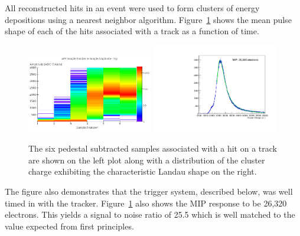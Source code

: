 All reconstructed hits in an event were used to form clusters of energy 
depositions using a nearest neighbor algorithm. Figure~\ref{fig:cluster_pulse}
shows the mean pulse shape of each of the hits associated with a track as a 
function of time.  
\begin{figure}[h]
	\includegraphics[width=0.49\textwidth]{test2012/svtperformance/svt_calib/08062012_run1351_samples_vs_amplitude.png}
	\includegraphics[width=0.49\textwidth]{test2012/svtperformance/svt_calib/run1351_mip_small.pdf}
    \caption{The six pedestal subtracted samples associated with a hit on a track 
             are shown on the left plot along with a distribution of the cluster
             charge exhibiting the characteristic Landau shape on the right. 
            }
	\label{fig:cluster_pulse}
\end{figure}
The figure also demonstrates that  the trigger system, described below, was well 
timed in with the tracker. Figure~\ref{fig:cluster_pulse} also shows the MIP 
response to be 26,320 electrons. This yields a signal to noise ratio
of 25.5 which is well matched to the value expected from first principles.


 
